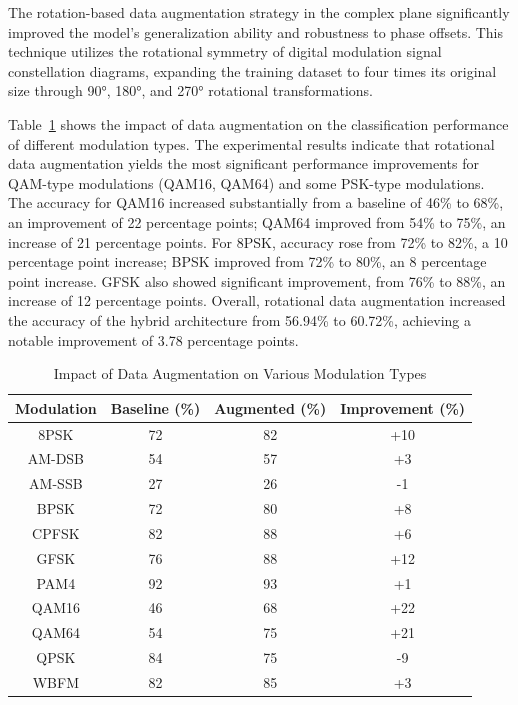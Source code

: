 \documentclass[conference]{IEEEtran}
\begin{document}
The rotation-based data augmentation strategy in the complex plane significantly improved the model's generalization ability and robustness to phase offsets. This technique utilizes the rotational symmetry of digital modulation signal constellation diagrams, expanding the training dataset to four times its original size through 90°, 180°, and 270° rotational transformations.

Table~\ref{tab:data_augmentation_results} shows the impact of data augmentation on the classification performance of different modulation types. The experimental results indicate that rotational data augmentation yields the most significant performance improvements for QAM-type modulations (QAM16, QAM64) and some PSK-type modulations. The accuracy for QAM16 increased substantially from a baseline of 46\% to 68\%, an improvement of 22 percentage points; QAM64 improved from 54\% to 75\%, an increase of 21 percentage points. For 8PSK, accuracy rose from 72\% to 82\%, a 10 percentage point increase; BPSK improved from 72\% to 80\%, an 8 percentage point increase. GFSK also showed significant improvement, from 76\% to 88\%, an increase of 12 percentage points. Overall, rotational data augmentation increased the accuracy of the hybrid architecture from 56.94\% to 60.72\%, achieving a notable improvement of 3.78 percentage points.

\begin{table}[!htbp]
\centering
\caption{Impact of Data Augmentation on Various Modulation Types}
\label{tab:data_augmentation_results}
\begin{tabular}{@{}cccc@{}}
\toprule
Modulation & Baseline (\%) & Augmented (\%) & Improvement (\%) \\
\midrule
8PSK     & 72  & 82  & +10 \\
AM-DSB   & 54  & 57  & +3  \\
AM-SSB   & 27  & 26  & -1  \\
BPSK     & 72  & 80  & +8  \\
CPFSK    & 82  & 88  & +6  \\
GFSK     & 76  & 88  & +12 \\
PAM4     & 92  & 93  & +1  \\
QAM16    & 46  & 68  & +22 \\
QAM64    & 54  & 75  & +21 \\
QPSK     & 84  & 75  & -9  \\
WBFM     & 82  & 85  & +3  \\
\bottomrule
\end{tabular}
\end{table}
\end{document}
